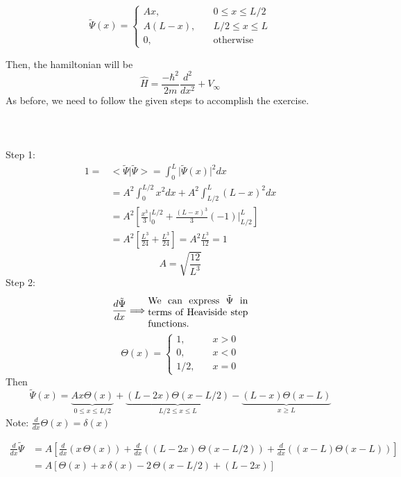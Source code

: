 \documentclass[12pt,fancychapters]{report}
\numberwithin{equation}{section}
\begin{document}
\[
  \tilde{\Psi} (x) = 
  \begin{cases}
    Ax, & \quad 0\leq x \leq L/2\\
    A(L-x), & \quad L/2 \leq x \leq L\\
    0, & \quad \text{otherwise}
  \end{cases}
\]

Then, the hamiltonian will be 
\[
  \hat{H} = \frac{-\hbar^2}{2m}\frac{d^2}{dx^2} + V_\infty 
\]
As before, we need to follow the given steps to accomplish the exercise.\\
\\
\\
\\
Step 1: 
\begin{align*}
  1 =& \big<\tilde{\Psi}\big|\tilde{\Psi} \big> = \int_{0}^{L}\big|\tilde{\Psi}(x)\big|^2dx\\
  &= A^2 \int_{0}^{L/2} x^2 dx  + A^2\int_{L/2}^{L} (L-x)^2dx\\
  &= A^2 \left[\frac{x^3}{3}\bigg|_{0}^{L/2} + \frac{(L-x)^3}{3}(-1)\bigg|_{L/2}^{L}\right]\\
  &= A^2 \left[\frac{L^3}{24}+\frac{L^3}{24} \right] = A^2 \frac{L^3}{12} = 1
\end{align*}
\[
  \boxed{A = \sqrt{\frac{12}{L^3}}}
\]
Step 2: 
\[
  \frac{d\tilde{\Psi}}{dx} \Longrightarrow \parbox{0.3\textwidth}{We can express $\tilde{\Psi}$
  in terms of Heaviside step functions.}
\]
\[
  \Theta (x) = 
  \begin{cases}
    1, & \quad x>0\\
    0, & \quad x < 0\\
    1/2, & \quad x = 0
  \end{cases}
\]
Then
\[
  \tilde{\Psi}(x) = \underbrace{Ax\Theta(x)}_{0\leq x\leq L/2} + 
  \underbrace{(L-2x)\Theta(x-L/2)}_{L/2\leq x\leq L} - 
  \underbrace{(L-x)\Theta(x-L)}_{x\geq L}
\]
Note: $\frac{d}{dx}\Theta(x) = \delta(x)$

\begin{align*}
  \frac{d}{dx}\tilde{\Psi} &= A\left[\frac{d}{dx}(x\,\Theta(x)) + \frac{d}{dx}((L-2x)\,
  \Theta(x-L/2)) + \frac{d}{dx}((x-L)\Theta(x-L))\right]\\
                           &= A\left[\Theta(x)+x\,\delta(x) - 2\,\Theta(x-L/2)+
                           (L-2x)\right]
\end{align*}

\clearpage
\newpage
\end{document}
